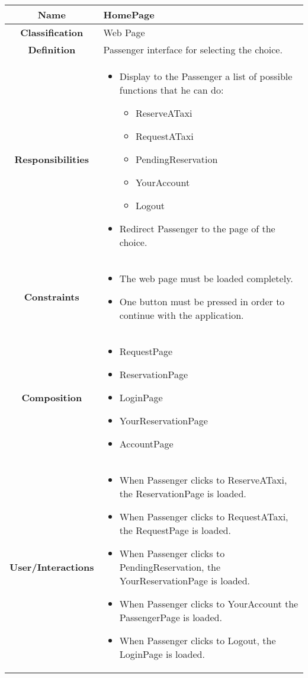 \documentclass[11pt, a4paper,titlepage]{article}
\begin{document}
\begin{enumerate}
\begin{tabularx}{\textwidth}{| c | X |}
	\hline
	\textbf{Name} & 
	HomePage
	\\
	\hline
	\textbf{Classification} & 
	Web Page
	\\
	\hline
	\textbf{Definition} & 
	Passenger interface for selecting the choice.
	\\
	\hline
	\textbf{Responsibilities} &
	\begin{itemize}
		\item 
		Display to the Passenger a list of possible functions that he can do:
		\begin{itemize}
			\item ReserveATaxi
			\item RequestATaxi
			\item PendingReservation
			\item YourAccount
			\item Logout    
		\end{itemize}
		\item  Redirect Passenger to the page of the choice.
	\end{itemize}
	\\
	\hline
	\textbf{Constraints} & 
	\begin{itemize}
		\item  The web page must be loaded completely.
		\item One button must be pressed in order to continue with the application.
	\end{itemize}
	\\
	\hline
	\textbf{Composition} & 
		\begin{itemize}
			\item RequestPage
			\item ReservationPage    
			\item LoginPage
			\item YourReservationPage    
			\item AccountPage
		\end{itemize}
	\\
	\hline
	\textbf{User/Interactions} & 
		\begin{itemize}
			\item When Passenger clicks to ReserveATaxi, the ReservationPage is loaded.            
			\item When Passenger clicks to RequestATaxi, the RequestPage is loaded.        
			\item When Passenger clicks to PendingReservation, the YourReservationPage is loaded.        
			\item When Passenger clicks to YourAccount the PassengerPage is loaded.    
			\item When Passenger clicks to Logout, the LoginPage is loaded.
		\end{itemize}	
	\\
	\hline	
\end{tabularx}


\end{enumerate}
\end{document}
